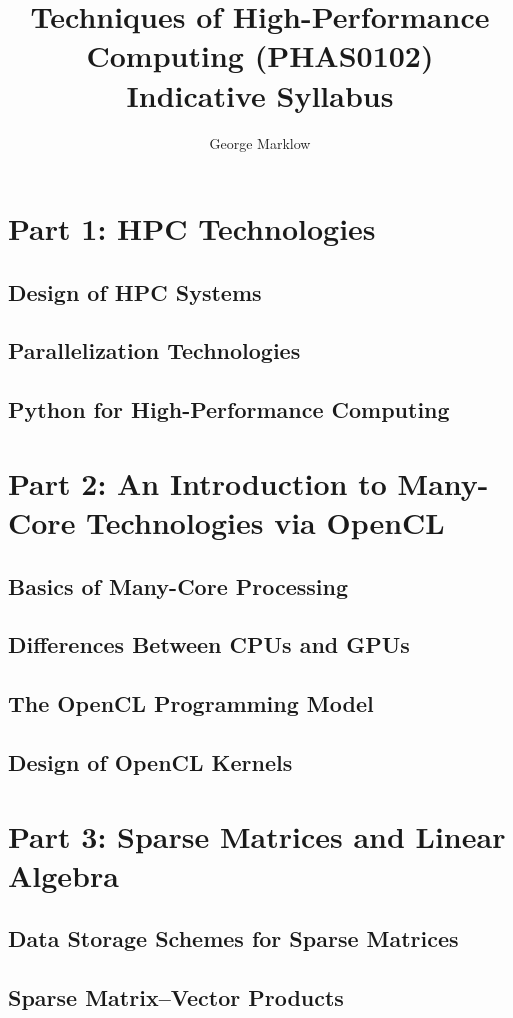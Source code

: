 \documentclass[12pt]{article}
\title{Techniques of High-Performance Computing (PHAS0102)\\Indicative Syllabus}
\author{George Marklow}
\date{}
\begin{document}
\maketitle

\section{Part 1: HPC Technologies}
\subsection{Design of HPC Systems}
\subsection{Parallelization Technologies}
\subsection{Python for High-Performance Computing}

\section{Part 2: An Introduction to Many-Core Technologies via OpenCL}
\subsection{Basics of Many-Core Processing}
\subsection{Differences Between CPUs and GPUs}
\subsection{The OpenCL Programming Model}
\subsection{Design of OpenCL Kernels}

\section{Part 3: Sparse Matrices and Linear Algebra}
\subsection{Data Storage Schemes for Sparse Matrices}
\subsection{Sparse Matrix--Vector Products}
\end{document}

